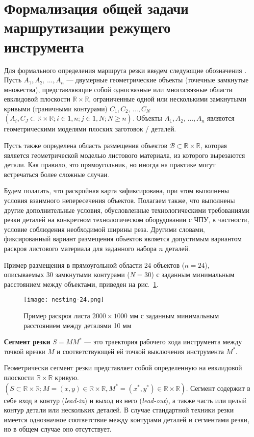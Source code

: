 
\section{Формализация общей задачи маршрутизации режущего инструмента}
\label{sec:cut.stmt}

Для формального определения маршрута резки введем следующие обозначения
\cite{bi:book2020,bib:petunin-2019}.
Пусть
$A_1, A_2, \,\dots, A_n$
--- двумерные геометрические объекты
(точечные замкнутые множества),
представляющие собой односвязные или
многосвязные области евклидовой плоскости
$\mathbb R \times \mathbb R$,
ограниченные одной или несколькими замкнутыми кривыми
(граничными контурами)
$C_1, C_2, \,\dots, C_N$
$(A_i, C_J \subset \mathbb R \times \mathbb R;
i \in \overline{1,n};
j \in \overline{1, N};
N \geqslant n)$.
Объекты
$A_1, A_2, \,\dots, A_n$
являются геометрическими моделями плоских заготовок / деталей.

Пусть также определена область размещения объектов
$\mathcal B \subset \mathbb R \times \mathbb R$,
которая является геометрической моделью листового материала,
из которого вырезаются детали.
Как правило, это прямоугольник,
но иногда на практике могут встречаться
более сложные случаи.

Будем полагать, что раскройная карта зафиксирована,
при этом выполнены условия взаимного непересечения объектов.
Полагаем также, что выполнены другие дополнительные условия,
обусловленные технологическими требованиями резки деталей
на конкретном технологическом оборудовании с ЧПУ,
в частности, условие соблюдения необходимой ширины реза.
Другими словами, фиксированный вариант размещения объектов
является допустимым вариантом раскроя листового материала
для заданного набора $n$ деталей.

Пример размещения в прямоугольной области 24 объектов
($n=24$),
описываемых 30 замкнутыми контурами
($N=30$)
с заданным минимальным расстоянием между объектами,
приведен на рис.~\ref{fig:cut.nesting}.

\begin{figure}
  \centering
  \texttt{[image: nesting-24.png]}
  \caption{
    Пример раскроя листа $2000 \times 1000$ мм
    с заданным минимальным расстоянием между деталями 10 мм
  }
  \label{fig:cut.nesting}
\end{figure}

\begin{opred}
  \label{def:cutting-segment}
  \textbf{Сегмент резки}
  $S=MM^*$
  --- это траектория рабочего хода
  инструмента между точкой врезки
  $M$
  и соответствующей ей точкой выключения инструмента
  $M^*$.
\end{opred}
Геометрически сегмент резки представляет собой
определенную на евклидовой плоскости
$\mathbb R \times \mathbb R$
кривую.
$(S \subset \mathbb R \times \mathbb R;
M=(x,y) \in \mathbb R \times \mathbb R,
M^* =(x^*,y^*)\in \mathbb R \times \mathbb R)$.
Сегмент содержит в себе вход в контур
(\textit{lead-in})
и выход из него
(\textit{lead-out}),
а также часть или целый контур детали
или нескольких деталей.
В случае стандартной техники резки
имеется однозначное соответствие между
контурами деталей и сегментами резки,
но в общем случае оно отсутствует.

